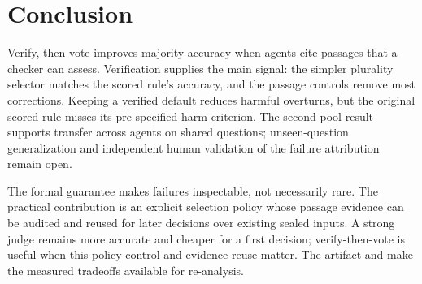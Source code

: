 \section{Conclusion}
\label{sec:conclusion}

Verify, then vote improves majority accuracy when agents cite passages that a checker can assess. Verification supplies the main signal: the simpler plurality selector matches the scored rule's accuracy, and the passage controls remove most corrections. Keeping a verified default reduces harmful overturns, but the original scored rule misses its pre-specified harm criterion. The second-pool result supports transfer across agents on shared questions; unseen-question generalization and independent human validation of the failure attribution remain open.

The formal guarantee makes failures inspectable, not necessarily rare. The practical contribution is an explicit selection policy whose passage evidence can be audited and reused for later decisions over existing sealed inputs. A strong judge remains more accurate and cheaper for a first decision; verify-then-vote is useful when this policy control and evidence reuse matter. The artifact and  make the measured tradeoffs available for re-analysis.

